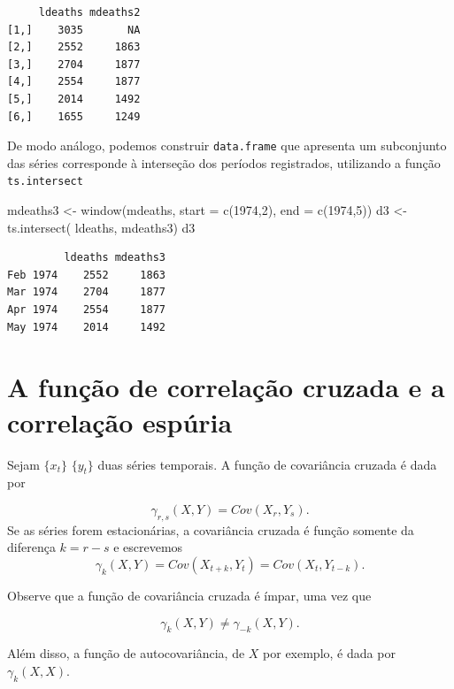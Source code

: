 \documentclass[
  letterpaper,
  DIV=11,
  numbers=noendperiod]{scrartcl}
\newenvironment{Shaded}{\begin{snugshade}}{\end{snugshade}}
\newcommand{\AttributeTok}[1]{\textcolor[rgb]{0.40,0.45,0.13}{#1}}
\newcommand{\DecValTok}[1]{\textcolor[rgb]{0.68,0.00,0.00}{#1}}
\newcommand{\FunctionTok}[1]{\textcolor[rgb]{0.28,0.35,0.67}{#1}}
\newcommand{\NormalTok}[1]{\textcolor[rgb]{0.00,0.23,0.31}{#1}}
\newcommand{\OtherTok}[1]{\textcolor[rgb]{0.00,0.23,0.31}{#1}}
\theoremstyle{plain}
\theoremstyle{plain}
\theoremstyle{definition}
\theoremstyle{definition}
\theoremstyle{remark}
\begin{document}
\begin{verbatim}
     ldeaths mdeaths2
[1,]    3035       NA
[2,]    2552     1863
[3,]    2704     1877
[4,]    2554     1877
[5,]    2014     1492
[6,]    1655     1249
\end{verbatim}

De modo análogo, podemos construir \texttt{data.frame} que apresenta um
subconjunto das séries corresponde à interseção dos períodos
registrados, utilizando a função \texttt{ts.intersect}

\begin{Shaded}
\begin{Highlighting}[]
\NormalTok{mdeaths3 }\OtherTok{\textless{}{-}} \FunctionTok{window}\NormalTok{(mdeaths, }\AttributeTok{start =} \FunctionTok{c}\NormalTok{(}\DecValTok{1974}\NormalTok{,}\DecValTok{2}\NormalTok{), }\AttributeTok{end =} \FunctionTok{c}\NormalTok{(}\DecValTok{1974}\NormalTok{,}\DecValTok{5}\NormalTok{))}
\NormalTok{d3 }\OtherTok{\textless{}{-}} \FunctionTok{ts.intersect}\NormalTok{( ldeaths, mdeaths3)}
\NormalTok{d3}
\end{Highlighting}
\end{Shaded}

\begin{verbatim}
         ldeaths mdeaths3
Feb 1974    2552     1863
Mar 1974    2704     1877
Apr 1974    2554     1877
May 1974    2014     1492
\end{verbatim}

\hypertarget{a-funuxe7uxe3o-de-correlauxe7uxe3o-cruzada-e-a-correlauxe7uxe3o-espuxfaria}{%
\section{A função de correlação cruzada e a correlação
espúria}\label{a-funuxe7uxe3o-de-correlauxe7uxe3o-cruzada-e-a-correlauxe7uxe3o-espuxfaria}}

Sejam \(\{x_t\}\) \(\{y_t\}\) duas séries temporais. A função de
covariância cruzada é dada por

\[\gamma_{r,s}(X,Y)=Cov(X_r,Y_s).\] Se as séries forem estacionárias, a
covariância cruzada é função somente da diferença \(k=r-s\) e escrevemos
\[\gamma_{k}(X,Y)=Cov(X_{t+k},Y_t)=Cov(X_{t},Y_{t-k}).\]

Observe que a função de covariância cruzada é ímpar, uma vez que

\[\gamma_{k}(X,Y)\neq \gamma_{-k}(X,Y).\]

Além disso, a função de autocovariância, de \(X\) por exemplo, é dada
por \(\gamma_k(X,X)\).
\end{document}
